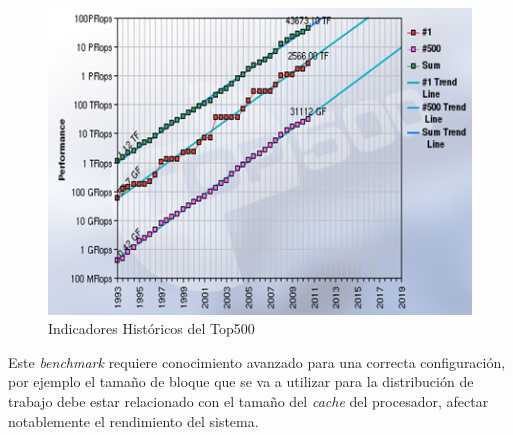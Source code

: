 \documentclass[a4paper]{report}
\begin{document}
\begin{figure}[H]
\begin{center}
\includegraphics[width=12cm]{top500.png}
\caption{Indicadores Hist\'oricos del Top500}
\end{center}
\end{figure}

\bigskip

Este {\it benchmark} requiere conocimiento avanzado para una correcta configuraci\'on,
por ejemplo el tama\~no de bloque que se va a utilizar para la distribuci\'on de trabajo debe estar relacionado con el tama\~no del {\it cache}
del procesador, afectar notablemente el rendimiento del sistema.
\end{document}
